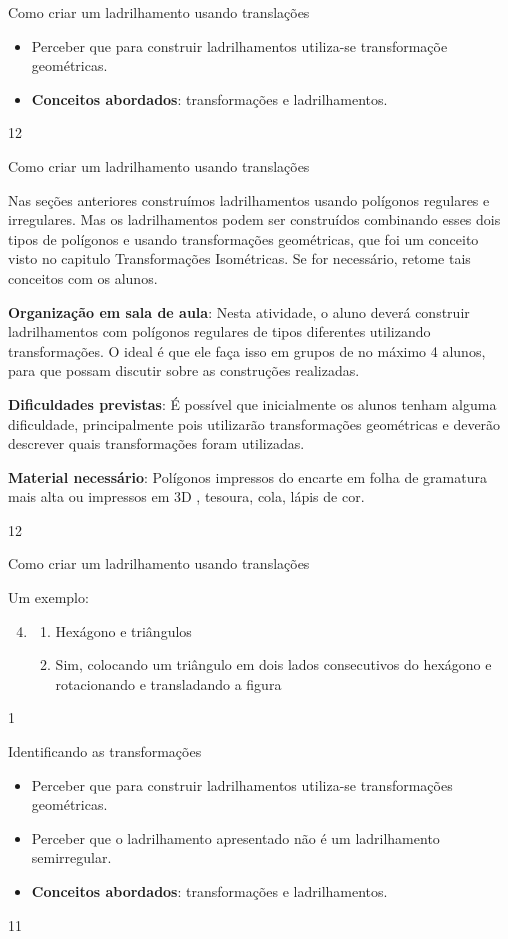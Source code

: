 \begin{objectives}{Como criar um ladrilhamento usando translações}
{
	\begin{itemize}
	\item Perceber que para construir ladrilhamentos utiliza-se transformaçõe geométricas.
	\item \textbf{Conceitos abordados}: transformações e ladrilhamentos.
	\end{itemize}
}{1}{2}
\end{objectives}
\begin{sugestions}{Como criar um ladrilhamento usando translações}
{
	Nas seções anteriores construímos ladrilhamentos usando polígonos regulares e irregulares. Mas os ladrilhamentos podem ser construídos combinando esses dois tipos de polígonos e usando transformações geométricas, que foi um conceito visto no capitulo Transformações Isométricas. Se for necessário, retome tais conceitos com os alunos.

	\textbf{Organização em sala de aula}: Nesta atividade, o aluno deverá construir ladrilhamentos com polígonos regulares de tipos diferentes utilizando transformações. O ideal é que ele faça isso em grupos de no máximo 4 alunos, para que possam discutir sobre as construções realizadas. 

	\textbf{Dificuldades previstas}: É possível que inicialmente os alunos tenham alguma dificuldade, principalmente pois utilizarão transformações geométricas e deverão descrever quais transformações foram utilizadas.

	\textbf{Material necessário}: Polígonos impressos do encarte em folha de gramatura mais alta ou impressos em 3D , tesoura, cola, lápis de cor.
}{1}{2}
\end{sugestions}
\begin{answer}{Como criar um ladrilhamento usando translações}
{
	Um exemplo:
	\begin{enumerate}
	\setcounter{enumi}{3}
		\item
		\begin{enumerate}
			\item Hexágono e triângulos
			\item Sim, colocando um triângulo em dois lados consecutivos do hexágono e rotacionando e transladando a figura
		\end{enumerate}
	\end{enumerate}
}{1}
\end{answer}
\clearmargin
\begin{objectives}{Identificando as transformações}
{
	\begin{itemize}
	\item Perceber que para construir ladrilhamentos utiliza-se transformações geométricas.
	\item Perceber que o ladrilhamento apresentado não é um ladrilhamento semirregular.
	\item \textbf{Conceitos abordados}: transformações e ladrilhamentos.
	\end{itemize}
}{1}{1}
\end{objectives}
